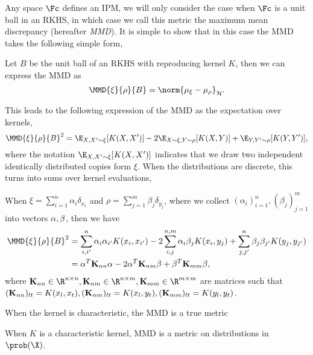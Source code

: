 Any space \(\Fc\) defines an IPM, we will only consider the case when \(\Fc\) is
a unit ball in an RKHS, in which case we call this metric the maximum mean
discrepancy (hereafter \emph{MMD}). It is simple to show that in this case the
MMD takes the following simple form,
\begin{theorem}
\label{th:mmd-is-norm-between-feature-maps} Let \(B\) be the unit ball of an
RKHS with reproducing kernel \(K\), then we can express the MMD as
\begin{equation}
\label{eq:mmd-is-norm-between-feature-maps} \MMD{\xi}{\rho}{B} = \norm{\mu_{\xi}
- \mu_{\rho}}_{\rkhs{H}}.
\end{equation}
\end{theorem} This leads to the following expression of the MMD as the
expectation over kernels,
\begin{equation*}
\label{eq:mmd-expectation-over-kernels} \MMD{\xi}{\rho}{B}^{2} = \E_{X, X' \sim
\xi}[K(X, X')] - 2 \E_{X \sim \xi, Y \sim \rho}[K(X, Y)] + \E_{Y, Y' \sim
\rho}[K(Y, Y')],
\end{equation*} where the notation \(\E_{X, X' \sim \xi}[K(X, X')]\) indicates
that we draw two independent identically distributed copies form \(\xi\). When
the distributions are discrete, this turns into sums over kernel evaluations,
\begin{corollary}
\label{cor:discrete-dists-MMD-sum} When \(\xi = \sum_{i=1}^{n}\alpha_{i}
\delta_{x_{i}}\) and \(\rho = \sum_{j=1}^{m} \beta_{j} \delta_{y_{j}}\), where
we collect \((\alpha_{i})_{i=1}^{n}, (\beta_{j})_{j=1}^{m}\) into vectors
\(\mathbf{\alpha}, \mathbf{\beta}\), then we have
  \begin{align*} \MMD{\xi}{\rho}{B}^{2} & = \sum_{i, i'}^{n} \alpha_i
\alpha_{i'}K(x_i, x_{i'}) - 2 \sum_{i, j}^{n, m} \alpha_i \beta_j K(x_i, y_j) +
\sum_{j, j'}^{n} \beta_j \beta_{j'}K(y_j, y_{j'}) \\ & = \mat{\alpha}^T
\mat{K}_{nn} \mat{\alpha} - 2 \mat{\alpha}^T \mat{K}_{nm} \mat{\beta} +
\mat{\beta}^T \mat{K}_{mm} \mat{\beta},
  \end{align*} where \(\mat{K}_{nn} \in \R^{n \times n}, \mat{K}_{nm} \in \R^{n
\times m}, \mat{K}_{mm} \in \R^{m \times m}\) are matrices such that
\((\mathbf{K}_{nn})_{lt} = K(x_l, x_t), (\mathbf{K}_{nm})_{lt} = K(x_l, y_t),
(\mathbf{K}_{mm})_{lt} = K(y_l, y_t)\).
\end{corollary}

When the kernel is characteristic, the MMD is a true metric
\begin{theorem}
\label{th:when-characteristic-kernel-mmd-is-metric} When \(K\) is a
characteristic kernel, MMD is a metric on distributions in \(\prob(\X)\).
\end{theorem}

